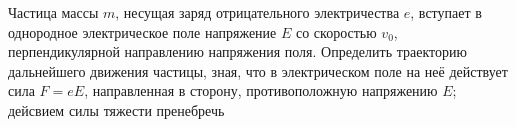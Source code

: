 Частица массы $m$, несущая заряд отрицательного электричества $e$, вступает в однородное электрическое поле напряжение $E$
со скоростью $v_{0}$, перпендикулярной направлению напряжения поля. Определить траекторию дальнейшего движения частицы,
зная, что в электрическом поле на неё действует сила $F=eE$, направленная в сторону, противоположную напряжению $E$;
дейсвием силы тяжести пренебречь
